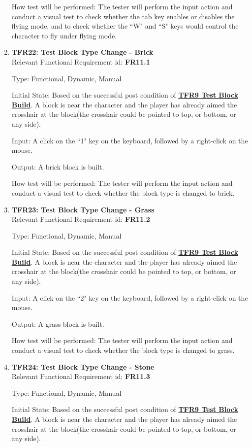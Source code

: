 \documentclass[12pt, titlepage]{article}
\begin{document}
\begin{enumerate}
How test will be performed: The tester will perform the input action and conduct a visual test to check whether the tab key enables or disables the flying mode, and to check whether the ``W" and ``S" keys would control the character to fly under flying mode.

\item{\textbf{TFR22: Test Block Type Change - Brick}\\}
Relevant Functional Requirement id: \textbf{FR11.1}

Type: Functional, Dynamic, Manual

Initial State: Based on the successful post condition of \hyperref[build]{\textbf{TFR9 Test Block Build}}. A block is near the character and the player has already aimed the crosshair at the block(the crosshair could be pointed to top, or bottom, or any side).

Input: A click on the ``1" key on the keyboard, followed by a right-click on the mouse.

Output: A brick block is built.

How test will be performed: The tester will perform the input action and conduct a visual test to check whether the block type is changed to brick.

\item{\textbf{TFR23: Test Block Type Change - Grass}\\}
Relevant Functional Requirement id: \textbf{FR11.2}

Type: Functional, Dynamic, Manual

Initial State: Based on the successful post condition of \hyperref[build]{\textbf{TFR9 Test Block Build}}. A block is near the character and the player has already aimed the crosshair at the block(the crosshair could be pointed to top, or bottom, or any side).

Input: A click on the ``2" key on the keyboard, followed by a right-click on the mouse.

Output: A grass block is built.

How test will be performed: The tester will perform the input action and conduct a visual test to check whether the block type is changed to grass.

\item{\textbf{TFR24: Test Block Type Change - Stone}\\}
Relevant Functional Requirement id: \textbf{FR11.3}

Type: Functional, Dynamic, Manual

Initial State: Based on the successful post condition of \hyperref[build]{\textbf{TFR9 Test Block Build}}. A block is near the character and the player has already aimed the crosshair at the block(the crosshair could be pointed to top, or bottom, or any side).


\end{enumerate}
\end{document}
